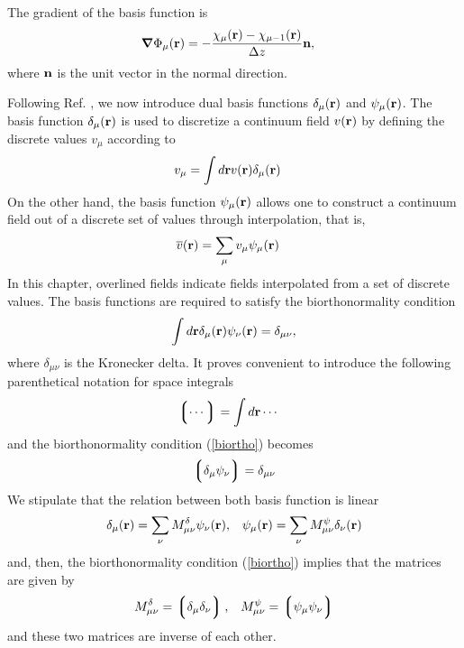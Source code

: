 \documentclass[b5paper,openright,10pt]{book}
\newcommand{\llg}{\left\lgroup}
\newcommand{\rlg}{\right\rgroup}
\begin{document}
The gradient of the basis function is
\begin{align}
\boldsymbol{\nabla}\Phi_\mu({\bf r})&=-\frac{\chi_\mu({\bf r})-\chi_{\mu-1}({\bf r})}{\Delta z}{\bf n},
\label{partialpsi}
\end{align}
where ${\bf n}$ is the unit vector in the normal direction.

Following  Ref. \cite{EspanolDonev2015},  we  now introduce  dual basis  functions
$\delta_\mu({\bf  r})$ and  $\psi_\mu({\bf r})$.   The basis  function
$\delta_\mu({\bf r})$ is used to  discretize a continuum field $v({\bf
  r})$ by defining the discrete values $v_\mu$ according to
\begin{align}
  v_\mu&=\int d{\bf r}v({\bf r})\delta_\mu({\bf r})
\label{Disc}
\end{align}
On the other hand,  the  basis function  $\psi_\mu({\bf r})$ allows one
to construct a continuum field out of a discrete set of values through
interpolation, that is,
\begin{align}
    \overline{v}({\bf r}) &=\sum_{\mu}v_\mu\psi_\mu({\bf r})
\label{Cont}
\end{align}
In this chapter, overlined fields indicate  fields interpolated from
a set of discrete values. 
The basis functions are required to
satisfy the biorthonormality condition
\begin{align}
  \int d{\bf r}\delta_\mu({\bf r})\psi_\nu({\bf r})=\delta_{\mu\nu},
\label{biortho}
\end{align}
where $\delta_{\mu\nu}$ is the Kronecker delta. 
It proves convenient to introduce the following 
parenthetical notation for space integrals
\begin{align}
  \llg \cdots\rlg &=\int d{\bf r}\cdots
\label{notation}
\end{align}
and the biorthonormality condition (\ref{biortho}) becomes
\begin{align}
\llg\delta_\mu\psi_\nu\rlg=\delta_{\mu\nu}
\label{biortho2}
\end{align}
We stipulate that the relation between both basis function is linear
\begin{align}
    \delta_\mu({\bf r})=\sum_\nu M^\delta_{\mu\nu}\psi_\nu({\bf r}),&&
  \psi_\mu({\bf r})=\sum_\nu M^\psi_{\mu\nu}\delta_\nu({\bf r})
\label{dual}
\end{align}
and, then, the biorthonormality condition (\ref{biortho}) implies that 
the matrices are given by
\begin{align}
    M^\delta_{\mu\nu}= \llg\delta_\mu\delta_\nu\rlg, &&
  M^\psi_{\mu\nu}= \llg\psi_\mu\psi_\nu\rlg
\label{MM}
\end{align}
and these two matrices are inverse of each other.
\end{document}
